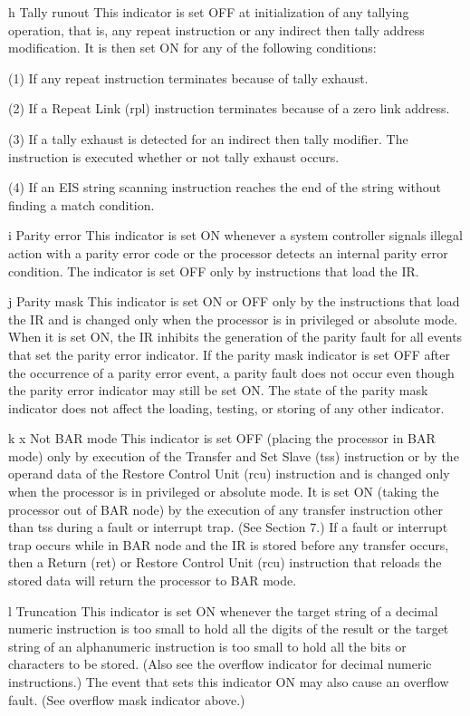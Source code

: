 h Tally runout This indicator is set OFF at initialization of any tallying
operation, that is, any repeat instruction or any indirect then tally address
modification. It is then set ON for any of the following conditions:

(1) If any repeat instruction terminates because of tally exhaust.

(2) If a Repeat Link (rpl) instruction terminates because of a zero link
address.

(3) If a tally exhaust is detected for an indirect then tally modifier. The
instruction is executed whether or not tally exhaust occurs.

(4) If an EIS string scanning instruction reaches the end of the string without finding a match condition.

i Parity error This indicator is set ON whenever a system controller signals
illegal action with a parity error code or the processor detects an internal
parity error condition. The indicator is set OFF only by instructions that load
the IR.

j Parity mask This indicator is set ON or OFF only by the instructions that
load the IR and is changed only when the processor is in privileged or absolute
mode. When it is set ON, the IR inhibits the generation of the parity fault for
all events that set the parity error indicator. If the parity mask indicator is
set OFF after the occurrence of a parity error event, a parity fault does not
occur even though the parity error indicator may still be set ON. The state of
the parity mask indicator does not affect the loading, testing, or storing of
any other indicator.

k x Not BAR mode This indicator is set OFF (placing the processor in BAR mode)
only by execution of the Transfer and Set Slave (tss) instruction or by the
operand data of the Restore Control Unit (rcu) instruction and is changed only
when the processor is in privileged or absolute mode. It is set ON (taking the
processor out of BAR node) by the execution of any transfer instruction other
than tss during a fault or interrupt trap. (See Section 7.) If a fault or
interrupt trap occurs while in BAR node and the IR is stored before any
transfer occurs, then a Return (ret) or Restore Control Unit (rcu) instruction
that reloads the stored data will return the processor to BAR mode.

l Truncation This indicator is set ON whenever the target string of a decimal
numeric instruction is too small to hold all the digits of the result or the
target string of an alphanumeric instruction is too small to hold all the bits
or characters to be stored. (Also see the overflow indicator for decimal
numeric instructions.) The event that sets this indicator ON may also cause an
overflow fault.  (See overflow mask indicator above.)

